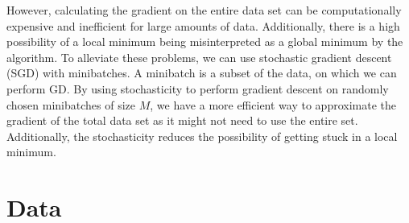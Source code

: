 \documentclass[a4paper, 11pt, twocolumn]{article}
\begin{document}
However, calculating the gradient on the entire data set can be computationally 
expensive and inefficient for large amounts of data. Additionally, there is a high 
possibility of a local minimum being misinterpreted as a global minimum by the 
algorithm. To alleviate these problems, we can use stochastic gradient descent 
(SGD) with minibatches.  A minibatch is a subset of the data, on which we can 
perform GD. By using stochasticity to perform gradient descent on randomly chosen 
minibatches of size $M$, we have a more efficient way to approximate the gradient 
of the total data set as it might not need to use the entire set. Additionally, 
the stochasticity reduces the possibility of getting stuck in a local minimum.

\section{Data}
\end{document}
